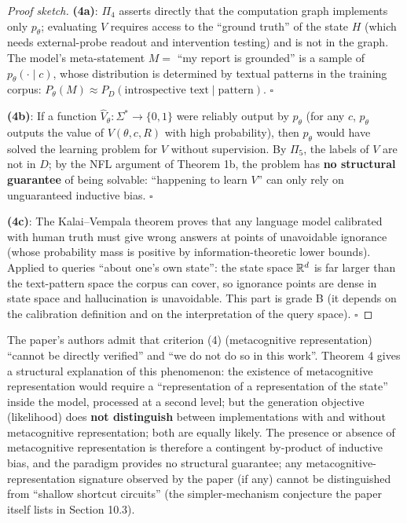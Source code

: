 \begin{proof}[Proof sketch]
\textbf{(4a)}: $\Pi_4$ asserts directly that the computation graph implements only $p_\theta$;
evaluating $V$ requires access to the ``ground truth'' of the state $H$ (which needs
external-probe readout and intervention testing) and is not in the graph. The model's
meta-statement $M = $ ``my report is grounded'' is a sample of $p_\theta(\cdot\mid c)$, whose
distribution is determined by textual patterns in the training corpus:
$P_\theta(M) \approx P_D(\text{introspective text} \mid \text{pattern})$. $\square$

\textbf{(4b)}: If a function $\widehat{V}_\theta: \Sigma^{*} \to \{0,1\}$ were reliably output
by $p_\theta$ (for any $c$, $p_\theta$ outputs the value of $V(\theta,c,R)$ with high
probability), then $p_\theta$ would have solved the learning problem for $V$ without
supervision. By $\Pi_5$, the labels of $V$ are not in $D$; by the NFL argument of Theorem 1b,
the problem has \textbf{no structural guarantee} of being solvable: ``happening to learn
$V$'' can only rely on unguaranteed inductive bias. $\square$

\textbf{(4c)}: The Kalai--Vempala theorem\cite{kalai-vempala-2023-calib} proves that any
language model calibrated with human truth must give wrong answers at points of unavoidable
ignorance (whose probability mass is positive by information-theoretic lower bounds). Applied
to queries ``about one's own state'': the state space $\mathbb{R}^d$ is far larger than the text-pattern
space the corpus can cover, so ignorance points are dense in state space and hallucination is
unavoidable. This part is grade B (it depends on the calibration definition and on the
interpretation of the query space). $\square$
\end{proof}

\begin{remark}
The paper's authors admit that criterion (4) (metacognitive representation) ``cannot be
directly verified'' and ``we do not do so in this work''\cite{lindsey-2026-introspection}.
Theorem 4 gives a structural explanation of this phenomenon: the existence of metacognitive
representation would require a ``representation of a representation of the state'' inside the
model, processed at a second level; but the generation objective (likelihood) does
\textbf{not distinguish} between implementations with and without metacognitive
representation; both are equally likely. The presence or absence of metacognitive
representation is therefore a contingent by-product of inductive bias, and the paradigm
provides no structural guarantee; any metacognitive-representation signature observed by the
paper (if any) cannot be distinguished from ``shallow shortcut circuits'' (the simpler-mechanism
conjecture the paper itself lists in Section 10.3\cite{lindsey-2026-introspection}).
\end{remark}


